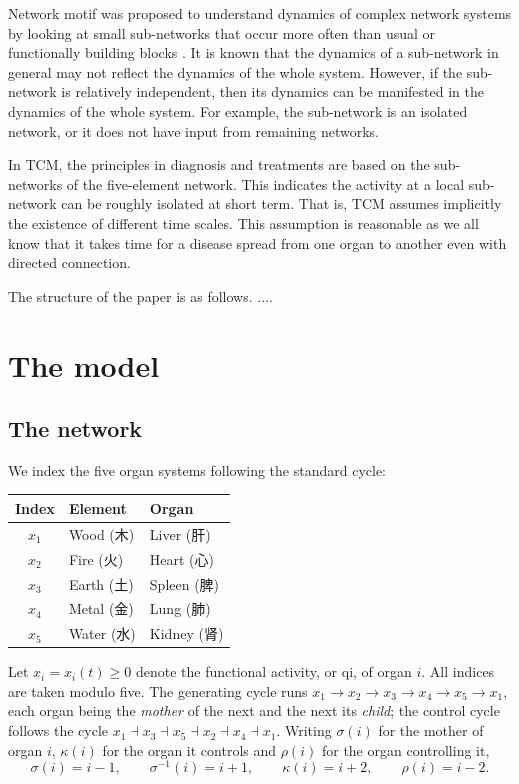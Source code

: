 \documentclass{article}
\begin{document}
Network motif was proposed to understand dynamics of complex network systems by looking at small sub-networks that occur more often than usual or functionally building blocks \cite{milo2002, Alon2007}. It is  known that the dynamics of a sub-network  in general may not reflect the dynamics of the whole system. However, if the  sub-network is relatively independent, then its dynamics can be manifested in the dynamics of the whole system.  For example, the sub-network is an isolated network, or it does not have input from remaining networks. 

In TCM, the principles in diagnosis and treatments are based on the sub-networks  of the five-element network.
This indicates the activity at a local sub-network can be roughly isolated at short term. That is, TCM assumes implicitly the existence of different time scales. This assumption is reasonable as we all know that it takes time for a disease spread from one organ to another even with directed connection. 



The structure of the paper is as follows. ....

\section{The model}

\subsection{The network}

We index the five organ systems following the standard cycle:

\begin{center}
	\begin{tabular}{cll}
		\toprule
		Index & Element & Organ \\
		\midrule
		$x_1$ & Wood\; (木) & Liver\; (肝) \\
		$x_2$ & Fire\; (火)  & Heart\; (心) \\
		$x_3$ & Earth\; (土) & Spleen\; (脾) \\
		$x_4$ & Metal\; (金) & Lung\; (肺) \\
		$x_5$ & Water\; (水) & Kidney\; (肾) \\
		\bottomrule
	\end{tabular}
\end{center}

Let $x_i=x_i(t)\ge 0$ denote the functional activity, or qi, of organ $i$. All indices are taken modulo five. The generating cycle runs $x_1\to x_2\to x_3\to x_4\to x_5\to x_1$, each organ being the \emph{mother} of the next and the next its \emph{child}; the control cycle follows the cycle $x_1\dashv x_3\dashv x_5\dashv x_2\dashv x_4\dashv x_1$. Writing $\sigma(i)$ for the mother of organ $i$, $\kappa(i)$ for the organ it controls and $\rho(i)$ for the organ controlling it,
\begin{equation}\label{eq:maps}
	\sigma(i)=i-1,\qquad \sigma^{-1}(i)=i+1,\qquad \kappa(i)=i+2,\qquad \rho(i)=i-2 .
\end{equation}
\end{document}
